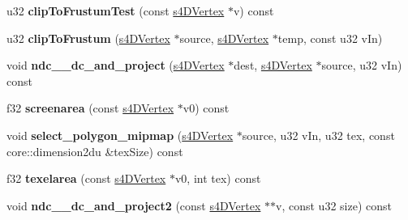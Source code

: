 \begin{DoxyCompactItemize}
\item 
\hypertarget{classirr_1_1video_1_1_c_burning_video_driver_a6f604e9cb9aae06e0a5db9b4e1d4eb01}{u32 {\bfseries clip\-To\-Frustum\-Test} (const \hyperlink{structirr_1_1video_1_1s4_d_vertex}{s4\-D\-Vertex} $\ast$v) const }\label{classirr_1_1video_1_1_c_burning_video_driver_a6f604e9cb9aae06e0a5db9b4e1d4eb01}

\item 
\hypertarget{classirr_1_1video_1_1_c_burning_video_driver_a6984b1d25640b355025106ab438636b5}{u32 {\bfseries clip\-To\-Frustum} (\hyperlink{structirr_1_1video_1_1s4_d_vertex}{s4\-D\-Vertex} $\ast$source, \hyperlink{structirr_1_1video_1_1s4_d_vertex}{s4\-D\-Vertex} $\ast$temp, const u32 v\-In)}\label{classirr_1_1video_1_1_c_burning_video_driver_a6984b1d25640b355025106ab438636b5}

\item 
\hypertarget{classirr_1_1video_1_1_c_burning_video_driver_a685099b9410730d97e2b8107302ea732}{void {\bfseries ndc\-\_\-\_\-dc\-\_\-and\-\_\-project} (\hyperlink{structirr_1_1video_1_1s4_d_vertex}{s4\-D\-Vertex} $\ast$dest, \hyperlink{structirr_1_1video_1_1s4_d_vertex}{s4\-D\-Vertex} $\ast$source, u32 v\-In) const }\label{classirr_1_1video_1_1_c_burning_video_driver_a685099b9410730d97e2b8107302ea732}

\item 
\hypertarget{classirr_1_1video_1_1_c_burning_video_driver_a6fda75eced6fd0c5a9f059a949a794f7}{f32 {\bfseries screenarea} (const \hyperlink{structirr_1_1video_1_1s4_d_vertex}{s4\-D\-Vertex} $\ast$v0) const }\label{classirr_1_1video_1_1_c_burning_video_driver_a6fda75eced6fd0c5a9f059a949a794f7}

\item 
\hypertarget{classirr_1_1video_1_1_c_burning_video_driver_a8cba399957b965a6e7ef8f40bd90758a}{void {\bfseries select\-\_\-polygon\-\_\-mipmap} (\hyperlink{structirr_1_1video_1_1s4_d_vertex}{s4\-D\-Vertex} $\ast$source, u32 v\-In, u32 tex, const core\-::dimension2du \&tex\-Size) const }\label{classirr_1_1video_1_1_c_burning_video_driver_a8cba399957b965a6e7ef8f40bd90758a}

\item 
\hypertarget{classirr_1_1video_1_1_c_burning_video_driver_a2ba1f612e48907fb5dfa649cf891e8c0}{f32 {\bfseries texelarea} (const \hyperlink{structirr_1_1video_1_1s4_d_vertex}{s4\-D\-Vertex} $\ast$v0, int tex) const }\label{classirr_1_1video_1_1_c_burning_video_driver_a2ba1f612e48907fb5dfa649cf891e8c0}

\item 
\hypertarget{classirr_1_1video_1_1_c_burning_video_driver_a5e29ee587e076d34e5639622cdb01085}{void {\bfseries ndc\-\_\-\_\-dc\-\_\-and\-\_\-project2} (const \hyperlink{structirr_1_1video_1_1s4_d_vertex}{s4\-D\-Vertex} $\ast$$\ast$v, const u32 size) const }\label{classirr_1_1video_1_1_c_burning_video_driver_a5e29ee587e076d34e5639622cdb01085}


\end{DoxyCompactItemize}
